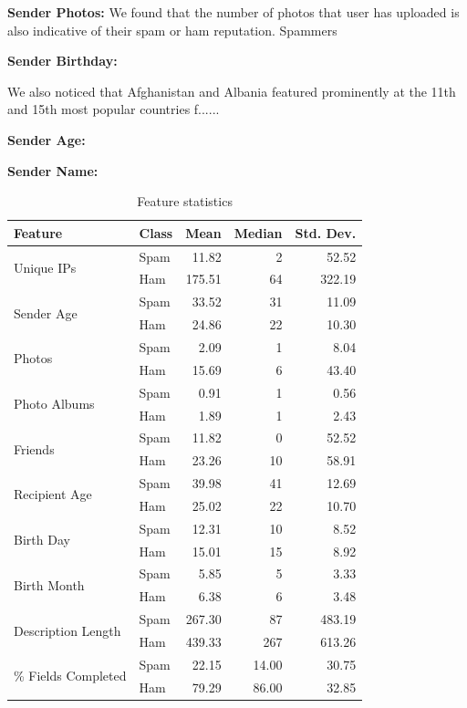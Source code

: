 \documentclass[preprint]{acm_proc_article-sp}
\begin{document}
\textbf{Sender Photos:} We found that the number of photos that user has uploaded is also indicative of their spam or ham reputation. Spammers 

\textbf{Sender Birthday:}

We also noticed that Afghanistan and Albania featured prominently at the 11th and 15th most popular countries f......

\textbf{Sender Age:}

\textbf{Sender Name:}

\begin{table}
\begin{tabular}{|l|l|r|r|r|}
    \hline
    Feature & Class & Mean & Median & Std. Dev.\\
    \hline
    \multirow{2}{*}{Unique IPs} & Spam & 11.82 & 2 & 52.52\\
    & Ham & 175.51 & 64 & 322.19\\
    \hline
    \multirow{2}{*}{Sender Age} & Spam & 33.52 & 31 & 11.09\\
    & Ham & 24.86 & 22 & 10.30\\
    \hline
    \multirow{2}{*}{Photos} & Spam & 2.09 & 1 & 8.04\\
    & Ham & 15.69 & 6 & 43.40\\
    \hline
    \multirow{2}{*}{Photo Albums} & Spam & 0.91 & 1 & 0.56\\
    & Ham & 1.89 & 1 & 2.43\\
    \hline
    \multirow{2}{*}{Friends} & Spam & 11.82 & 0 & 52.52\\
    & Ham & 23.26 & 10 & 58.91\\
    \hline
    \multirow{2}{*}{Recipient Age} & Spam & 39.98 & 41 & 12.69\\
    & Ham & 25.02 & 22 & 10.70\\
    \hline
    \multirow{2}{*}{Birth Day} & Spam & 12.31 & 10 & 8.52\\
    & Ham & 15.01 & 15 & 8.92\\
    \hline
    \multirow{2}{*}{Birth Month} & Spam & 5.85 & 5 & 3.33\\
    & Ham & 6.38 & 6 & 3.48\\
    \hline
    \multirow{2}{*}{Description Length} & Spam & 267.30 & 87 & 483.19\\
    & Ham & 439.33 & 267 & 613.26\\
    \hline
    \multirow{2}{*}{\% Fields Completed} & Spam & 22.15 & 14.00 & 30.75\\
    & Ham & 79.29 & 86.00 & 32.85\\
    \hline
\end{tabular}
\caption{Feature statistics}
\label{featsat}
\end{table}
\end{document}
